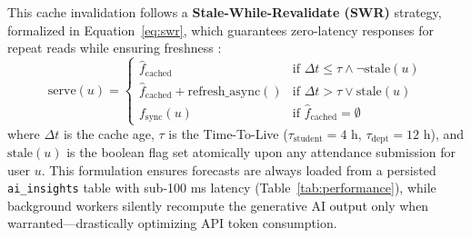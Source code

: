 \documentclass[]{einformatica}
\begin{document}
This cache invalidation follows a \textbf{Stale-While-Revalidate (SWR)} strategy, formalized in Equation~\ref{eq:swr}, which guarantees zero-latency responses for repeat reads while ensuring freshness \cite{nist2023}:
\begin{equation} \label{eq:swr}
\text{serve}(u) = \begin{cases}
\hat{f}_{\text{cached}} & \text{if } \Delta t \leq \tau \wedge \neg\text{stale}(u) \\
\hat{f}_{\text{cached}} + \text{refresh\_async}() & \text{if } \Delta t > \tau \vee \text{stale}(u) \\
f_{\text{sync}}(u) & \text{if } \hat{f}_{\text{cached}} = \emptyset
\end{cases}
\end{equation}
where $\Delta t$ is the cache age, $\tau$ is the Time-To-Live ($\tau_{\text{student}} = 4\text{ h}$, $\tau_{\text{dept}} = 12\text{ h}$), and $\text{stale}(u)$ is the boolean flag set atomically upon any attendance submission for user $u$. This formulation ensures forecasts are always loaded from a persisted \texttt{ai\_insights} table with sub-100 ms latency (Table~\ref{tab:performance}), while background workers silently recompute the generative AI output only when warranted—drastically optimizing API token consumption.
\end{document}

